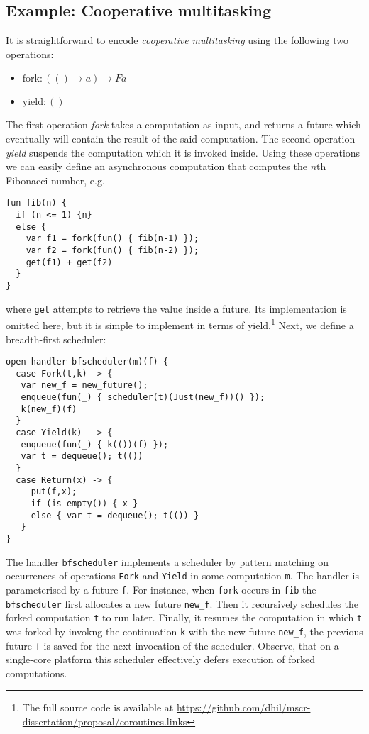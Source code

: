 \documentclass[preprint,10pt,numbers]{sigplanconf}
\begin{document}
\subsection{Example: Cooperative multitasking}
It is straightforward to encode \emph{cooperative multitasking} using the following two operations:
\begin{itemize}
  \item $\text{fork} : (() \to a) \to F a$
  \item $\text{yield} : ()$
\end{itemize}
The first operation \emph{fork} takes a computation as input, and returns a future which eventually will contain the result of the said computation. The second operation \emph{yield} suspends the computation which it is invoked inside. Using these operations we can easily define an asynchronous computation that computes the $n$th Fibonacci number, e.g. 
\begin{lstlisting}[style={links},caption={}]
fun fib(n) {
  if (n <= 1) {n}
  else {
    var f1 = fork(fun() { fib(n-1) });
    var f2 = fork(fun() { fib(n-2) });
    get(f1) + get(f2)
  }
}
\end{lstlisting}
where \texttt{get} attempts to retrieve the value inside a future. Its implementation is omitted here, but it is simple to implement in terms of yield.\footnote{The full source code is available at \url{https://github.com/dhil/mscr-dissertation/proposal/coroutines.links}} Next, we define a breadth-first scheduler:
\begin{lstlisting}[style={links},caption={}]
open handler bfscheduler(m)(f) {
  case Fork(t,k) -> {
   var new_f = new_future();
   enqueue(fun(_) { scheduler(t)(Just(new_f))() });
   k(new_f)(f)
  }
  case Yield(k)  -> { 
   enqueue(fun(_) { k(())(f) }); 
   var t = dequeue(); t(()) 
  }
  case Return(x) -> {
     put(f,x);
     if (is_empty()) { x }
     else { var t = dequeue(); t(()) }
   } 
}
\end{lstlisting}
The handler \texttt{bfscheduler} implements a scheduler by pattern matching on occurrences of operations \texttt{Fork} and \texttt{Yield} in some computation \texttt{m}. The handler is parameterised by a future \texttt{f}. For instance, when \texttt{fork} occurs in \texttt{fib} the \texttt{bfscheduler} first allocates a new future \texttt{new\_f}. Then it recursively schedules the forked computation \texttt{t} to run later. Finally, it resumes the computation in which \texttt{t} was forked by invokng the continuation \texttt{k} with the new future \texttt{new\_f}, the previous future \texttt{f} is saved for the next invocation of the scheduler. Observe, that on a single-core platform this scheduler effectively defers execution of forked computations.
\end{document}
